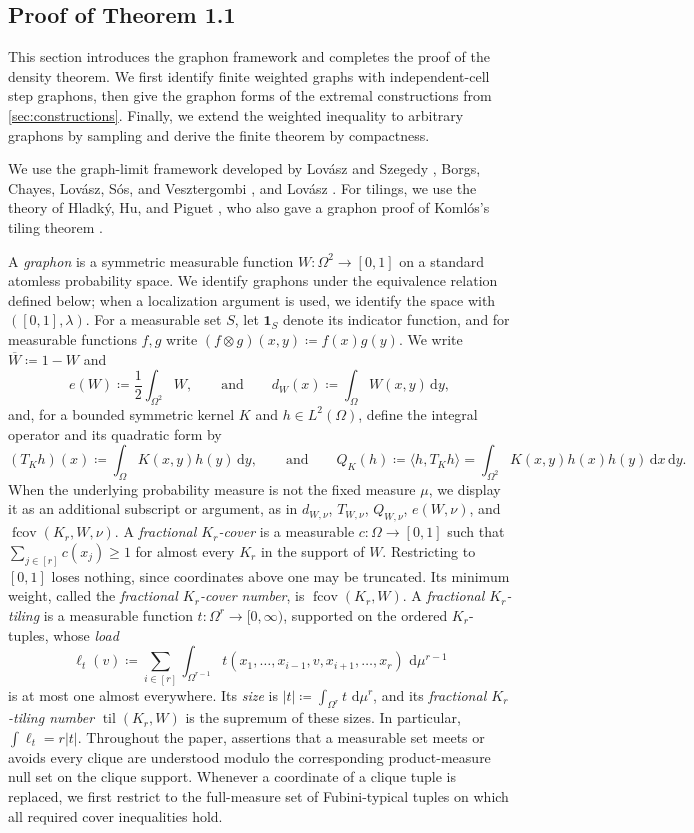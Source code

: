 \documentclass[10pt]{article}
\numberwithin{equation}{section}
\newcommand{\til}{\operatorname{til}}
\newcommand{\fcov}{\operatorname{fcov}}
\newcommand{\one}{\mathbf 1}
\newcommand{\dd}{\,\mathrm d}
\begin{document}
\subsection{Proof of Theorem 1.1}\label{sec:prelim}

This section introduces the graphon framework and completes the proof of the density theorem.  We first identify finite weighted graphs with independent-cell step graphons, then give the graphon forms of the extremal constructions from \cref{sec:constructions}.  Finally, we extend the weighted inequality to arbitrary graphons by sampling and derive the finite theorem by compactness.

We use the graph-limit framework developed by Lov\'asz and Szegedy \cite{LovaszSzegedy06}, Borgs, Chayes, Lov\'asz, S\'os, and Vesztergombi \cite{BCLSV}, and Lov\'asz \cite{Lovasz}.  For tilings, we use the theory of Hladk\'y, Hu, and Piguet \cite{HHP21}, who also gave a graphon proof of Koml\'os's tiling theorem \cite{HHP19}.

A \emph{graphon} is a symmetric measurable function $W:\Omega^2\to[0,1]$ on a standard atomless probability space.  We identify graphons under the equivalence relation defined below; when a localization argument is used, we identify the space with $([0,1],\lambda)$.  For a measurable set $S$, let $\one_S$ denote its indicator function, and for measurable functions $f,g$ write $(f\otimes g)(x,y)\coloneqq f(x)g(y)$.  We write $\overline W\coloneqq1-W$ and
\[
 e(W)\coloneqq\frac12\int_{\Omega^2}W,
 \qquad\text{and}\qquad
 d_W(x)\coloneqq\int_\Omega W(x,y)\dd y,
\]
and, for a bounded symmetric kernel $K$ and $h\in L^2(\Omega)$, define the integral operator and its quadratic form by
\[
 (T_Kh)(x)\coloneqq\int_\Omega K(x,y)h(y)\dd y,
 \qquad\text{and}\qquad
 Q_K(h)\coloneqq\langle h,T_Kh\rangle
 =\int_{\Omega^2}K(x,y)h(x)h(y)\dd x\dd y.
\]
When the underlying probability measure is not the fixed measure $\mu$, we display it as an additional subscript or argument, as in $d_{W,\nu}$, $T_{W,\nu}$, $Q_{W,\nu}$, $e(W,\nu)$, and $\fcov(K_r,W,\nu)$.
A \emph{fractional $K_r$-cover} is a measurable $c:\Omega\to[0,1]$ such that $\sum_{j\in[r]}c(x_j)\ge1$ for almost every $K_r$ in the support of $W$.  Restricting to $[0,1]$ loses nothing, since coordinates above one may be truncated.  Its minimum weight, called the \emph{fractional $K_r$-cover number}, is $\fcov(K_r,W)$.  A \emph{fractional $K_r$-tiling} is a measurable function $t:\Omega^r\to[0,\infty)$, supported on the ordered $K_r$-tuples, whose \emph{load}
\[
 \ell_t(v)\coloneqq\sum_{i\in[r]}
 \int_{\Omega^{r-1}}t(x_1,\ldots,x_{i-1},v,x_{i+1},\ldots,x_r)
 \,\dd\mu^{r-1}
\]
is at most one almost everywhere.  Its \emph{size} is $|t|\coloneqq\int_{\Omega^r}t\,\dd\mu^r$, and its \emph{fractional $K_r$-tiling number} $\til(K_r,W)$ is the supremum of these sizes.  In particular, $\int\ell_t=r|t|$.  Throughout the paper, assertions that a measurable set meets or avoids every clique are understood modulo the corresponding product-measure null set on the clique support.  Whenever a coordinate of a clique tuple is replaced, we first restrict to the full-measure set of Fubini-typical tuples on which all required cover inequalities hold.
\end{document}
